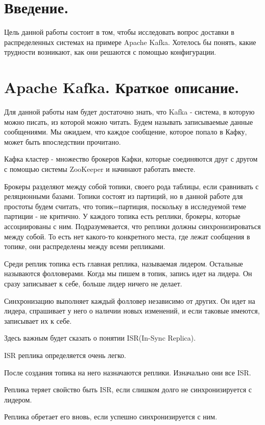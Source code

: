 \documentclass[11pt]{article}
\begin{document}
    \section{Введение.}
    Цель данной работы состоит в том, чтобы исследовать вопрос доставки в распределенных системах на примере Apache
    Kafka. Хотелось бы понять, какие трудности возникают, как они решаются с помощью конфигурации.
    \section{Apache Kafka. Краткое описание.}
    Для данной работы нам будет достаточно знать, что Kafka - система, в которую можно писать, из которой можно
    читать. Будем называть записываемые данные сообщениями. Мы ожидаем, что каждое сообщение, которое попало в Кафку,
    может быть впоследствии прочитано.

    Кафка кластер - множество брокеров Кафки, которые соединяются друг с другом с помощью системы ZooKeeper и
    начинают работать вместе.

    Брокеры разделяют между собой топики, своего рода таблицы, если сравнивать с реляционными базами. Топики состоят
    из партиций, но в данной работе для простоты будем считать, что топик=партиция, поскольку в исследуемой теме
    партиции - не критично. У каждого топика есть реплики, брокеры, которые ассоциированы с ним. Подразумевается, что
    реплики должны синхронизироваться между собой. То есть нет какого-то конкретного места, где лежат сообщения в
    топике, они распределены между всеми репликами.

    Среди реплик топика есть главная реплика, называемая лидером. Остальные называются фолловерами. Когда мы пишем в
    топик, запись идет на лидера. Он сразу записывает к себе, больше лидер ничего не делает.

    Синхронизацию выполняет каждый фолловер независимо от других. Он идет на лидера, спрашивает у него о наличии
    новых изменений, и если таковые имеются, записывает их к себе.

    Здесь важным будет сказать о понятии ISR(In-Sync Replica).

    ISR реплика определяется очень легко.

    После создания топика на него назначаются реплики. Изначально они все ISR.

    Реплика теряет свойство быть ISR, если слишком долго не синхронизируется с лидером.

    Реплика обретает его вновь, если успешно синхронизируется с ним.
\end{document}
